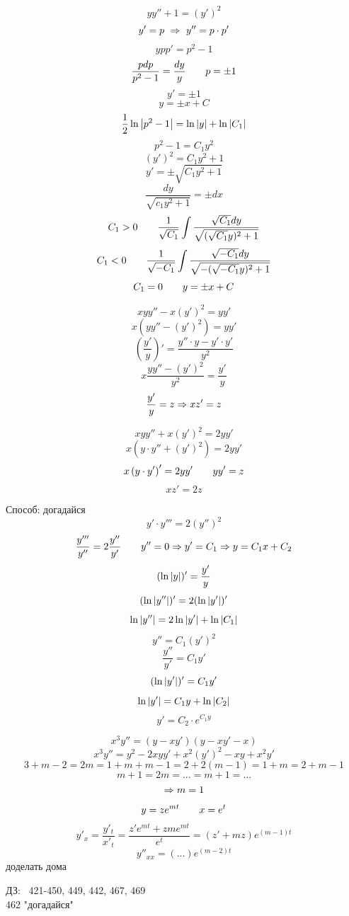 \documentclass[12pt, fleqn]{article}
\begin{document}
\begin{lect}
    \begin{Task}[226]
        \[yy'' + 1 = (y')^2\]
        \[y' = p\ \Rightarrow\ y'' = p \cdot p'\]
        \[ypp' = p^2 - 1\]
        \[\frac{pdp}{p^2 - 1} = \frac{dy}{y} \qquad p = \pm 1\]
        \[y' = \pm 1\]
        \[y = \pm x + C\]
        \[\frac{1}{2}\ln\left|p^2 - 1\right| = \ln\left|y\right| + \ln \left|C_1\right|\]
        \[p^2 - 1 = C_1y^2\]
        \[(y')^2 = C_1y^2 + 1\]
        \[y' = \pm \sqrt{C_1 y^2 + 1}\]
        \[\frac{dy}{\sqrt{c_1y^2 + 1}} = \pm dx\]
        \[C_1 > 0 \qquad \frac{1}{\sqrt{C_1}} \int \frac{\sqrt{C_1}dy}{\sqrt{(\sqrt{C_1}y)^2 + 1}}\]
        \[C_1 < 0 \qquad \frac{1}{\sqrt{-C_1}} \int \frac{\sqrt{-C_1}dy}{\sqrt{-(\sqrt{-C_1}y)^2 + 1}}\]
        \[C_1 = 0 \qquad y = \pm x + C\]
    \end{Task}

    \begin{Task}[?]
        \[xyy'' - x(y')^2 = yy'\]
        \[x(yy'' - (y')^2) = yy'\]
        \[\left(\frac{y'}{y}\right)' = \frac{y'' \cdot y - y' \cdot y'}{y^2}\]
        \[x\frac{yy'' - (y')^2}{y^2} = \frac{y'}{y}\]
        \[\frac{y'}{y} = z \Rightarrow xz' = z\]
    \end{Task}

    \begin{Task}[366]
        \[xyy'' + x(y')^2 = 2yy'\]
        \[x(y \cdot y'' + (y')^2) = 2yy'\]
        \[x\left(y \cdot y'\right)' = 2yy' \qquad yy' = z\]
        \[xz' = 2z\]
    \end{Task}


    \begin{Task}[466]
        Способ: догадайся
        \[y' \cdot y''' = 2(y'')^2\]
        \[\frac{y'''}{y''} = 2 \frac{y''}{y'} \qquad y'' = 0 \Rightarrow y' = C_1 \Rightarrow y = C_1x + C_2\]
        \[(\ln \left|y\right|)' = \frac{y'}{y}\]
        \[(\ln \left|y''\right|)' = 2(\ln \left|y'\right|)'\]
        \[\ln \left|y''\right| = 2\ln \left|y'\right| + \ln \left|C_1\right|\]
        \[y'' = C_1 (y')^2\]
        \[\frac{y''}{y'} = C_1 y'\]
        \[(\ln \left|y'\right|)' = C_1 y'\]
        \[\ln \left|y'\right| = C_1 y + \ln \left|C_2\right|\]
        \[y' = C_2 \cdot e^{C_1 y} \]
    \end{Task}

    \begin{Task}[?]
        \[x^3 y'' = (y - xy')(y - xy' - x)\]
        \[x^3 y'' = y^2 - 2xyy' + x^2(y')^2 - xy + x^2 y'\]
        \[3 + m - 2 = 2m = 1 + m + m -1 = 2 + 2(m - 1) = 1 + m = 2 + m - 1\]
        \[m + 1 = 2m = ... = m + 1 = ...\]
        \[\Rightarrow m = 1\]
        \[y = ze^{mt} \qquad x = e^t \]
        \[y'_x = \frac{y'_t}{x'_t} = \frac{z' e^{mt} + zm e^{mt}  }{e^t} = (z' + mz)e^{(m - 1)t} \]
        \[y''_{xx} = (...) e^{(m - 2)t}  \]
        доделать дома
    \end{Task}

    ДЗ: \ 421-450, 449, 442, 467, 469\\
    462 "догадайся"


\end{lect}
\end{document}
